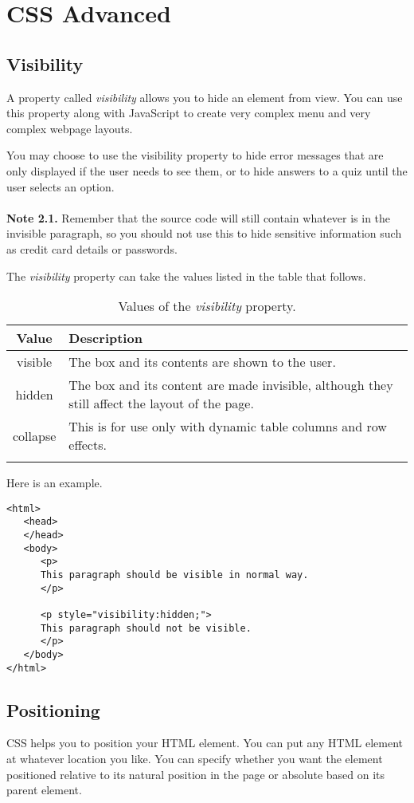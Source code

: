 \documentclass[a4paper,oneside]{book}
\numberwithin{equation}{chapter}
\begin{document}
\chapter{CSS Advanced}
\section{Visibility}
A property called \textit{visibility} allows you to hide an element from view. You can use this property along with JavaScript to create very complex menu and very complex webpage layouts.

You may choose to use the visibility property to hide error messages that are only displayed if the user needs to see them, or to hide answers to a quiz until the user selects an option.\\
\\
\textbf{Note 2.1.} Remember that the source code will still contain whatever is in the invisible paragraph, so you should not use this to hide sensitive information such as credit card details or passwords.

The \textit{visibility} property can take the values listed in the table that follows.
\begin{center}
\begin{longtable}{|c|p{10cm}|}
\hline
\textbf{Value} & \textbf{Description} \\
\hline
visible & The box and its contents are shown to the user.\\
\hline
hidden & The box and its content are made invisible, although they still affect the layout of the page.\\
\hline
collapse & This is for use only with dynamic table columns and row effects.\\
\hline
\caption{Values of the \textit{visibility} property.}
\end{longtable}
\end{center}
Here is an example.
\begin{verbatim}
<html>
   <head>
   </head>
   <body>
      <p>
      This paragraph should be visible in normal way.
      </p>
   
      <p style="visibility:hidden;">
      This paragraph should not be visible.
      </p>
   </body>
</html> 
\end{verbatim}
\section{Positioning}
CSS helps you to position your HTML element. You can put any HTML element at whatever location you like. You can specify whether you want the element positioned relative to its natural position in the page or absolute based on its parent element.
\end{document}
